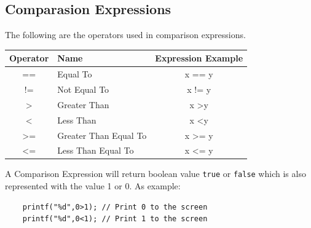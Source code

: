 \subsection{Comparasion Expressions}
The following are the operators used in comparison expressions.
\begin{center}
	\begin{tabular}{|c|l|c|}
		\hline
		Operator        & Name                  & \multicolumn{1}{l|}{Expression Example} \\ \hline
		==              & Equal To              & x == y                                  \\ \hline
		!=              & Not Equal To          & x != y                                  \\ \hline
		\textgreater{}  & Greater Than          & x \textgreater y                        \\ \hline
		\textless{}     & Less Than             & x \textless y                           \\ \hline
		\textgreater{}= & Greater Than Equal To & x \textgreater{}= y                     \\ \hline
		\textless{}=    & Less Than Equal To    & x \textless{}= y                        \\ \hline
	\end{tabular}
\end{center}

A Comparison Expression will return boolean value \verb|true| or \verb|false| which is also represented with the value 1 or 0.
As example:
\begin{verbatim}
    printf("%d",0>1); // Print 0 to the screen
    printf("%d",0<1); // Print 1 to the screen
\end{verbatim}

